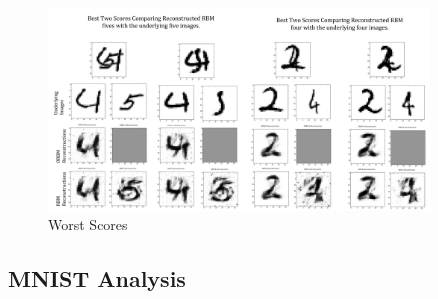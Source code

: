 \begin{figure}[htb]
  \begin{center}
    \includegraphics[width=0.9\textwidth]{Assets/results/orbm-Worst-2-results.png}
  \end{center}
  \caption{Worst Scores}
  \label{F:Worst-Results-MNIST}
\end{figure}


\subsection{MNIST Analysis}




